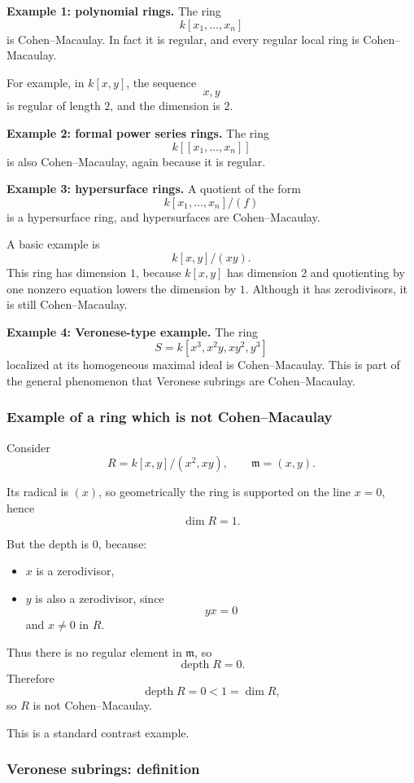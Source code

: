 \documentclass[12pt,a4paper]{article}
\theoremstyle{notespace}
\DeclareMathOperator{\depth}{depth}
\begin{document}
\textbf{Example 1: polynomial rings.}
The ring
\[
k[x_1,\dots,x_n]
\]
is Cohen--Macaulay. In fact it is regular, and every regular local ring is Cohen--Macaulay.

For example, in \(k[x,y]\), the sequence
\[
x,y
\]
is regular of length \(2\), and the dimension is \(2\).

\medskip

\textbf{Example 2: formal power series rings.}
The ring
\[
k[[x_1,\dots,x_n]]
\]
is also Cohen--Macaulay, again because it is regular.

\medskip

\textbf{Example 3: hypersurface rings.}
A quotient of the form
\[
k[x_1,\dots,x_n]/(f)
\]
is a hypersurface ring, and hypersurfaces are Cohen--Macaulay.

A basic example is
\[
k[x,y]/(xy).
\]
This ring has dimension \(1\), because \(k[x,y]\) has dimension \(2\) and quotienting by one nonzero equation lowers the dimension by \(1\). Although it has zerodivisors, it is still Cohen--Macaulay.

\medskip

\textbf{Example 4: Veronese-type example.}
The ring
\[
S=k[x^3,x^2y,xy^2,y^3]
\]
localized at its homogeneous maximal ideal is Cohen--Macaulay. This is part of the general phenomenon that Veronese subrings are Cohen--Macaulay.

\subsubsection{Example of a ring which is not Cohen--Macaulay}

Consider
\[
R=k[x,y]/(x^2,xy),
\qquad
\mathfrak m=(x,y).
\]

Its radical is \((x)\), so geometrically the ring is supported on the line \(x=0\), hence
\[
\dim R=1.
\]

But the depth is \(0\), because:
\begin{itemize}
	\item \(x\) is a zerodivisor,
	\item \(y\) is also a zerodivisor, since
	\[
	yx=0
	\]
	and \(x\neq 0\) in \(R\).
\end{itemize}

Thus there is no regular element in \(\mathfrak m\), so
\[
\depth R=0.
\]
Therefore
\[
\depth R=0<1=\dim R,
\]
so \(R\) is not Cohen--Macaulay.

This is a standard contrast example.

\subsubsection{Veronese subrings: definition}
\end{document}
